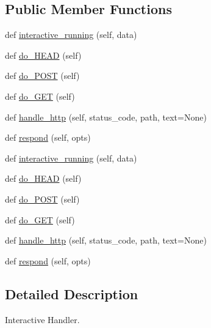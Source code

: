 \subsection*{Public Member Functions}
\begin{DoxyCompactItemize}
\item 
def \hyperlink{classinteractive_1_1MyHandler_ada828133485ee47cad9bfadf450fc49a}{interactive\+\_\+running} (self, data)
\item 
def \hyperlink{classinteractive_1_1MyHandler_a6255cc42ad4ffd494808bed1c0e2b3fb}{do\+\_\+\+H\+E\+AD} (self)
\item 
def \hyperlink{classinteractive_1_1MyHandler_a59070990ac52dada4b7c532f76af749f}{do\+\_\+\+P\+O\+ST} (self)
\item 
def \hyperlink{classinteractive_1_1MyHandler_a718f9206286bfce516ecbc3cd33bb960}{do\+\_\+\+G\+ET} (self)
\item 
def \hyperlink{classinteractive_1_1MyHandler_a5941a3caf26e4d5931324edbdbf51f8b}{handle\+\_\+http} (self, status\+\_\+code, path, text=None)
\item 
def \hyperlink{classinteractive_1_1MyHandler_a90d22dc71dcfeeedcb3c6d4ce61cccf1}{respond} (self, opts)
\item 
def \hyperlink{classinteractive_1_1MyHandler_ada828133485ee47cad9bfadf450fc49a}{interactive\+\_\+running} (self, data)
\item 
def \hyperlink{classinteractive_1_1MyHandler_a6255cc42ad4ffd494808bed1c0e2b3fb}{do\+\_\+\+H\+E\+AD} (self)
\item 
def \hyperlink{classinteractive_1_1MyHandler_a59070990ac52dada4b7c532f76af749f}{do\+\_\+\+P\+O\+ST} (self)
\item 
def \hyperlink{classinteractive_1_1MyHandler_a718f9206286bfce516ecbc3cd33bb960}{do\+\_\+\+G\+ET} (self)
\item 
def \hyperlink{classinteractive_1_1MyHandler_a5941a3caf26e4d5931324edbdbf51f8b}{handle\+\_\+http} (self, status\+\_\+code, path, text=None)
\item 
def \hyperlink{classinteractive_1_1MyHandler_a90d22dc71dcfeeedcb3c6d4ce61cccf1}{respond} (self, opts)
\end{DoxyCompactItemize}


\subsection{Detailed Description}
\begin{DoxyVerb}Interactive Handler.\end{DoxyVerb}
 


